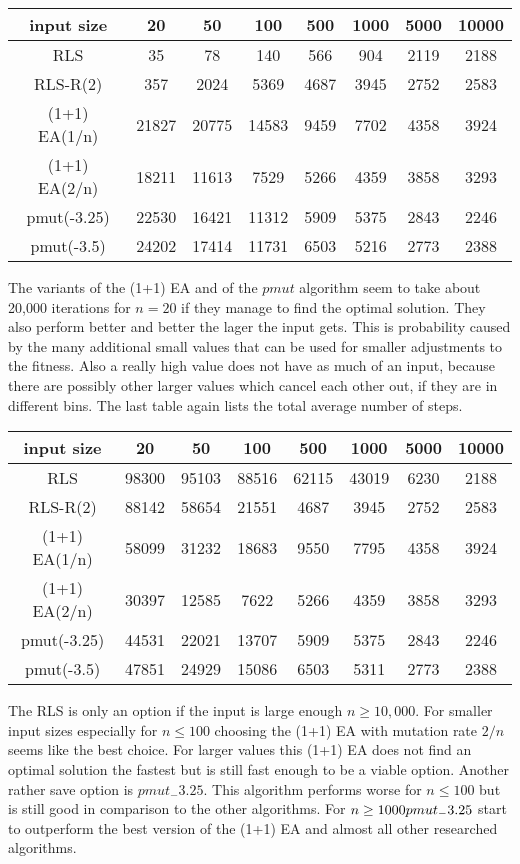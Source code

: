 \begin{tabular}{cccccccc}
      input size    & 20    & 50    & 100   & 500  & 1000 & 5000 & 10000 \\\hline
      RLS           & 35    & 78    & 140   & 566  & 904  & 2119 & 2188  \\
      RLS-R(2)      & 357   & 2024  & 5369  & 4687 & 3945 & 2752 & 2583  \\
      (1+1) EA(1/n) & 21827 & 20775 & 14583 & 9459 & 7702 & 4358 & 3924  \\
      (1+1) EA(2/n) & 18211 & 11613 & 7529  & 5266 & 4359 & 3858 & 3293  \\
      pmut(-3.25)   & 22530 & 16421 & 11312 & 5909 & 5375 & 2843 & 2246  \\
      pmut(-3.5)    & 24202 & 17414 & 11731 & 6503 & 5216 & 2773 & 2388  \\
\end{tabular}

The variants of the (1+1) EA and of the $pmut$ algorithm seem to take about 20,000 iterations for $n=20$ if they manage to find the optimal solution.
They also perform better and better the lager the input gets.
This is probability caused by the many additional small values that can be used for smaller adjustments to the fitness.
Also a really high value does not have as much of an input, because there are possibly other larger values which cancel each other out, if they are in different bins.
The last table again lists the total average number of steps.

\begin{tabular}{cccccccc}
      input size    & 20    & 50    & 100   & 500   & 1000  & 5000 & 10000 \\\hline
      RLS           & 98300 & 95103 & 88516 & 62115 & 43019 & 6230 & 2188  \\
      RLS-R(2)      & 88142 & 58654 & 21551 & 4687  & 3945  & 2752 & 2583  \\
      (1+1) EA(1/n) & 58099 & 31232 & 18683 & 9550  & 7795  & 4358 & 3924  \\
      (1+1) EA(2/n) & 30397 & 12585 & 7622  & 5266  & 4359  & 3858 & 3293  \\
      pmut(-3.25)   & 44531 & 22021 & 13707 & 5909  & 5375  & 2843 & 2246  \\
      pmut(-3.5)    & 47851 & 24929 & 15086 & 6503  & 5311  & 2773 & 2388  \\
\end{tabular}

The RLS is only an option if the input is large enough $n \ge 10,000$. For smaller input sizes especially for $n \le 100$ choosing the (1+1) EA with mutation rate $2/n$ seems like the best choice. For larger values this (1+1) EA does not find an optimal solution the fastest but is still fast enough to be a viable option. Another rather save option is $pmut_-3.25$. This algorithm performs worse for $n \le 100$ but is still good in comparison to the other algorithms. For $n \ge 1000 \space pmut_-3.25$ start to outperform the best version of the (1+1) EA and almost all other researched algorithms.